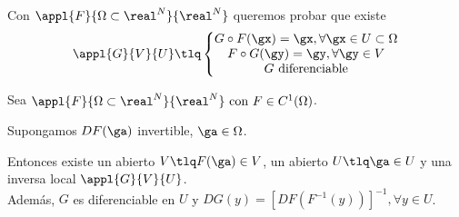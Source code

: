 \documentclass{apuntes}
\newcommand{\invers}[1]{#1 ^ {-1}}
\newcommand{\F}{\invers{F}}
\begin{document}
Con $\appl{F}{\Omega\subset \real^N}{\real^N}$ queremos probar que existe $$\appl{G}{V}{U} \tlq \left\{\begin{matrix} G\circ F(\gx) = \gx, \forall\gx\in U \subset \Omega\\
F\circ G(\gy) = \gy, \forall \gy \in V\\
G \text{ diferenciable} \end{matrix}\right.$$

\begin{theorem} 
Sea $\appl{F}{\Omega\subset\real^N}{\real^N} \text{ con } F\in C^1(\Omega)$.

Supongamos $DF(\ga)$ invertible, $\ga \in \Omega$.

Entonces existe un abierto $V \tlq F(\ga)\in V$, un abierto $U \tlq \ga \in U$ y una inversa local $\appl{G}{V}{U}$.\\
Además, $G$ es diferenciable en $U$ y $DG(y) = \left[DF(\F(y))\right]^{-1}, \forall y \in U$.
\end{theorem}
\end{document}
